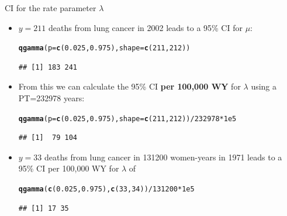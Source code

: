 \documentclass[10pt,handout]{beamer}\usepackage[]{graphicx}\usepackage[]{color}
\makeatletter
\newcommand{\hlnum}[1]{\textcolor[rgb]{0.686,0.059,0.569}{#1}}%
\newcommand{\hlopt}[1]{\textcolor[rgb]{0,0,0}{#1}}%
\newcommand{\hlstd}[1]{\textcolor[rgb]{0.345,0.345,0.345}{#1}}%
\newcommand{\hlkwc}[1]{\textcolor[rgb]{0.333,0.667,0.333}{#1}}%
\newcommand{\hlkwd}[1]{\textcolor[rgb]{0.737,0.353,0.396}{\textbf{#1}}}%
\newenvironment{kframe}{%
 \def\at@end@of@kframe{}%
 \ifinner\ifhmode%
  \def\at@end@of@kframe{\end{minipage}}%
  \begin{minipage}{\columnwidth}%
 \fi\fi%
 \def\FrameCommand##1{\hskip\@totalleftmargin \hskip-\fboxsep
 \colorbox{shadecolor}{##1}\hskip-\fboxsep
     \hskip-\linewidth \hskip-\@totalleftmargin \hskip\columnwidth}%
 \MakeFramed {\advance\hsize-\width
   \@totalleftmargin\z@ \linewidth\hsize
   \@setminipage}}%
 {\par\unskip\endMakeFramed%
 \at@end@of@kframe}
\newenvironment{knitrout}{}{} %
\makeatother
\begin{document}
\begin{frame}[fragile]{CI for the rate  parameter $\lambda$}
	
	
	\begin{itemize}
		\setlength\itemsep{1.5em}
		\small
		\item $y=211$ deaths from lung cancer in 2002 leads to a 95\% CI for $\mu$:
		
\begin{knitrout}\tiny
{}\color{fgcolor}\begin{kframe}
\begin{alltt}
\hlkwd{qgamma}\hlstd{(}\hlkwc{p} \hlstd{=} \hlkwd{c}\hlstd{(}\hlnum{0.025}\hlstd{,} \hlnum{0.975}\hlstd{),} \hlkwc{shape} \hlstd{=} \hlkwd{c}\hlstd{(}\hlnum{211}\hlstd{,} \hlnum{212}\hlstd{))}
\end{alltt}
\begin{verbatim}
## [1] 183 241
\end{verbatim}
\end{kframe}
\end{knitrout}
		
		\pause 
		
		\item From this we can calculate the 95\% CI \textbf{per 100,000 WY} for $\lambda$ using a PT=232978 years:
		
\begin{knitrout}\tiny
{}\color{fgcolor}\begin{kframe}
\begin{alltt}
\hlkwd{qgamma}\hlstd{(}\hlkwc{p} \hlstd{=} \hlkwd{c}\hlstd{(}\hlnum{0.025}\hlstd{,} \hlnum{0.975}\hlstd{),} \hlkwc{shape} \hlstd{=} \hlkwd{c}\hlstd{(}\hlnum{211}\hlstd{,} \hlnum{212}\hlstd{))} \hlopt{/} \hlnum{232978} \hlopt{*} \hlnum{1e5}
\end{alltt}
\begin{verbatim}
## [1]  79 104
\end{verbatim}
\end{kframe}
\end{knitrout}
		
		\pause
		
		\item $y=33$ deaths from lung cancer in 131200 women-years in 1971 leads to a 95\% CI per 100,000 WY for $\lambda$ of
		
\begin{knitrout}\tiny
{}\color{fgcolor}\begin{kframe}
\begin{alltt}
\hlkwd{qgamma}\hlstd{(}\hlkwd{c}\hlstd{(}\hlnum{0.025}\hlstd{,}\hlnum{0.975}\hlstd{),} \hlkwd{c}\hlstd{(}\hlnum{33}\hlstd{,}\hlnum{34}\hlstd{))} \hlopt{/} \hlnum{131200} \hlopt{*} \hlnum{1e5}
\end{alltt}
\begin{verbatim}
## [1] 17 35
\end{verbatim}
\end{kframe}
\end{knitrout}
		

\end{itemize}
\end{frame}
\end{document}
